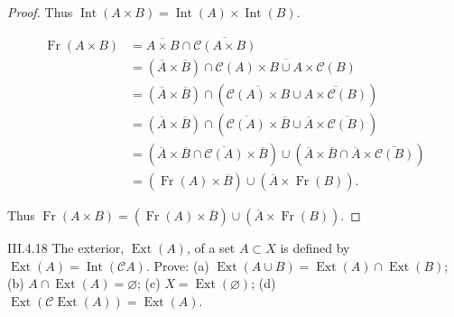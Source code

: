 \begin{proof}
	Thus \( \operatorname{Int}(A\times B) = \operatorname{Int}(A) \times \operatorname{Int}(B) \).

	\hrulefill%
	\begingroup
	\allowdisplaybreaks%
	\begin{align*}
		\operatorname{Fr}(A \times B) & = \overline{A \times B} \cap \overline{\mathscr{C}(A \times B)}                                                                                                                                              \\
		                              & = (\overline{A} \times \overline{B}) \cap \overline{\mathscr{C}(A) \times B \cup A \times \mathscr{C}(B)}                                                                                                    \\
		                              & = (\overline{A} \times \overline{B}) \cap \left( \overline{\mathscr{C}(A) \times B} \cup \overline{A\times \mathscr{C}(B)} \right)                                                                           \\
		                              & = (\overline{A} \times \overline{B}) \cap \left( \overline{\mathscr{C}(A)} \times \overline{B} \cup \overline{A} \times \overline{\mathscr{C}(B)} \right)                                                    \\
		                              & = \left( \overline{A} \times \overline{B} \cap \overline{\mathscr{C}(A)} \times \overline{B} \right) \cup \left( \overline{A} \times \overline{B} \cap \overline{A} \times \overline{\mathscr{C}(B)} \right) \\
		                              & = \left( \operatorname{Fr}(A) \times \overline{B} \right) \cup \left( \overline{A} \times \operatorname{Fr}(B) \right).
	\end{align*}
	\endgroup

	Thus \( \operatorname{Fr}(A \times B) = \left( \operatorname{Fr}(A) \times \overline{B} \right) \cup \left( \overline{A} \times \operatorname{Fr}(B) \right) \).
\end{proof}

\begin{problem}{III.4.18}
The exterior, \( \operatorname{Ext}(A) \), of a set \(A \subset X\) is defined by \( \operatorname{Ext}(A) = \operatorname{Int}(\mathscr{C}A) \). Prove: (a) \( \operatorname{Ext}(A \cup B) = \operatorname{Ext}(A) \cap \operatorname{Ext}(B) \); (b) \( A \cap \operatorname{Ext}(A) = \varnothing \); (c) \( X = \operatorname{Ext}(\varnothing) \); (d) \( \operatorname{Ext}(\mathscr{C}\operatorname{Ext}(A)) = \operatorname{Ext}(A) \).
\end{problem}

